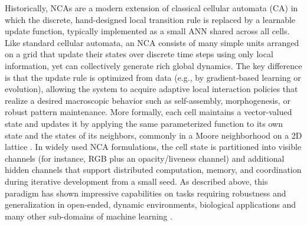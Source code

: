 \documentclass[letterpaper]{article}
\begin{document}
Historically, NCAs are a modern extension of classical cellular automata (CA) \cite{kari2005theory} in which the discrete, hand-designed local transition rule is replaced by a learnable update function, typically implemented as a small ANN shared across all cells. Like standard cellular automata, an NCA consists of many simple units arranged on a grid that update their states over discrete time steps using only local information, yet can collectively generate rich global dynamics. 
The key difference is that the update rule is optimized from data (e.g., by gradient-based learning or evolution), allowing the system to acquire adaptive local interaction policies that realize a desired macroscopic behavior such as self-assembly, morphogenesis, or robust pattern maintenance. More formally, each cell maintains a  vector-valued state and updates it by applying the same parameterized function to its own state and the states of its neighbors, commonly in a Moore neighborhood on a 2D lattice \cite{hartl2025neural}.  In widely used NCA formulations, the cell state is partitioned into visible channels (for instance, RGB plus an opacity/liveness channel) and additional hidden channels that support distributed computation, memory, and coordination during iterative development from a small seed. As described above, this paradigm has shown impressive capabilities on tasks requiring robustness and generalization in open-ended, dynamic environments, biological applications and many other sub-domains of machine learning \cite{hartl2025neural, guichard2025arcnca, xu2025neural}.

\end{document}
